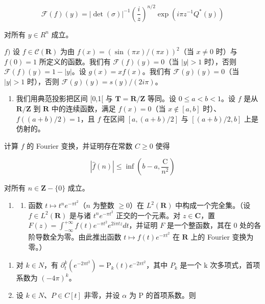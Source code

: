 \[
\mathscr {F} (f) (y) = | \det (\sigma) | ^ {- 1} \left(\frac {i}{z}\right) ^ {n / 2} \exp (i \pi z ^ {- 1} Q ^ {*} (y))
\]

对所有 \(y \in R^{n}\) 成立。

\(f)\) 设 \(f \in \mathcal{C}(\mathbf{R})\) 为由 \(f(x) = (\sin(\pi x)/(\pi x))^2\)（当 \(x \neq 0\) 时）与 \(f(0) = 1\) 所定义的函数。我们有 \(\mathcal{F}(f)(y) = 0\)（当 \(|y| > 1\) 时），否则 \(\mathcal{F}(f)(y) = 1 - |y|\)。设 \(g(x) = xf(x)\)。我们有 \(\mathcal{F}(g)(y) = 0\)（当 \(|y| > 1\) 时），否则 \(\mathcal{F}(g)(y) = s(y)/(2i\pi)\)。

\begin{enumerate}
\def\labelenumi{\arabic{enumi})}
\setcounter{enumi}{1}
\tightlist
\item
  我们用典范投影把区间 {[}0,1{[} 与 \(\mathbf{T} = \mathbf{R} / \mathbf{Z}\) 等同。设 \(0 \leqslant a < b < 1\)。设 \(f\) 是从 \(\mathbf{R} / \mathbf{Z}\) 到 \(\mathbf{R}\) 中的连续函数，满足 \(f(x) = 0\)（当 \(x \notin [a,b]\) 时）、\(f((a + b) / 2) = 1\)，且 \(f\) 在区间 \([a, (a + b) / 2]\) 与 \([(a + b) / 2, b]\) 上是仿射的。
\end{enumerate}

计算 \(f\) 的 Fourier 变换，并证明存在常数 \(C \geqslant 0\) 使得

\[
| \widehat {f} (n) | \leqslant \inf \left(b - a, \frac {\mathrm{C}}{n ^ {2}}\right)
\]

对所有 \(n \in \mathbf{Z} - \{0\}\) 成立。

\begin{enumerate}
\def\labelenumi{\arabic{enumi})}
\setcounter{enumi}{2}
\tightlist
\item
  \begin{enumerate}
  \def\labelenumii{\alph{enumii})}
  \tightlist
  \item
    函数 \(t \mapsto t^n e^{-\pi t^2}\)（\(n\) 为整数 \(\geqslant 0\)）在 \(L^2(\mathbf{R})\) 中构成一个完全集。（设 \(f \in L^2(\mathbf{R})\) 是与诸 \(t^n e^{-\pi t^2}\) 正交的一个元素。对 \(z \in \mathbf{C}\)，置 \(F(z) = \int_{-\infty}^{+\infty} f(t)e^{-\pi t^2}e^{2i\pi tz}dt\)，并证明 \(F\) 是一个整函数，其在 0 处的各阶导数全为零。由此推出函数 \(t \mapsto f(t)e^{-\pi t^2}\) 在 \(\mathbf{R}\) 上的 Fourier 变换为零。）
  \end{enumerate}
\end{enumerate}

\begin{enumerate}
\def\labelenumi{\alph{enumi})}
\setcounter{enumi}{1}
\item
  对 \(k \in N\)，有 \(\partial_{t}^{k}(e^{-2\pi t^{2}}) = \mathrm{P}_{k}(t)e^{-2\pi t^{2}}\)，其中 \(P_{k}\) 是一个 k 次多项式，首项系数为 \((-4\pi)^{k}\)。
\item
  设 \(k \in N\)、\(P \in C[t]\) 非零，并设 \(\alpha\) 为 P 的首项系数。则
\end{enumerate}

